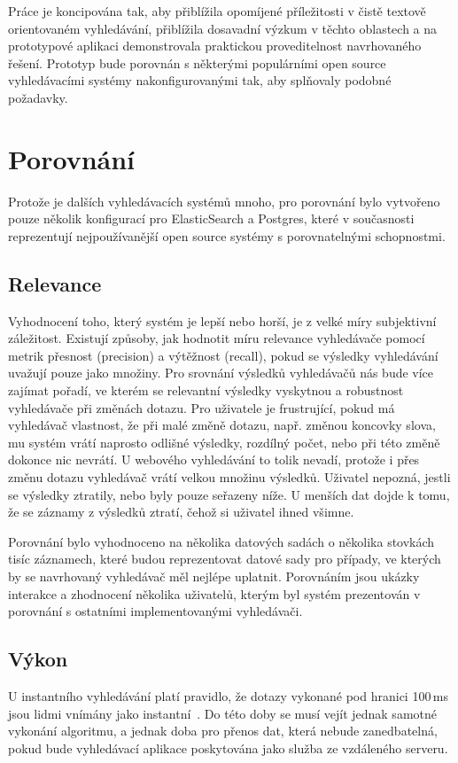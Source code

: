 \documentclass[11pt,letterpaper,oneside,openright]{book}
\begin{document}
Práce je koncipována tak, aby přiblížila opomíjené příležitosti v čistě textově
orientovaném vyhledávání, přiblížila dosavadní výzkum v těchto oblastech a na
prototypové aplikaci demonstrovala praktickou proveditelnost navrhovaného
řešení. Prototyp bude porovnán s některými populárními open source
vyhledávacími systémy nakonfigurovanými tak, aby splňovaly podobné požadavky.

\section{Porovnání}
Protože je dalších vyhledávacích systémů mnoho, pro porovnání bylo vytvořeno
pouze několik konfigurací pro ElasticSearch a Postgres, které v současnosti
reprezentují nejpoužívanější open source systémy s porovnatelnými schopnostmi.

\subsection{Relevance}
Vyhodnocení toho, který systém je lepší nebo horší, je z velké míry subjektivní
záležitost. Existují způsoby, jak hodnotit míru relevance vyhledávače pomocí
metrik přesnost (precision) a výtěžnost (recall), pokud se výsledky vyhledávání
uvažují pouze jako množiny. Pro srovnání výsledků vyhledávačů nás bude více
zajímat pořadí, ve kterém se relevantní výsledky vyskytnou a robustnost
vyhledávače při změnách dotazu. Pro uživatele je frustrující, pokud má
vyhledávač vlastnost, že při malé změně dotazu, např. změnou koncovky slova, mu
systém vrátí naprosto odlišné výsledky, rozdílný počet, nebo při této změně
dokonce nic nevrátí. U webového vyhledávání to tolik nevadí, protože i přes
změnu dotazu vyhledávač vrátí velkou množinu výsledků. Uživatel nepozná, jestli
se výsledky ztratily, nebo byly pouze seřazeny níže. U menších dat dojde k
tomu, že se záznamy z výsledků ztratí, čehož si uživatel ihned všimne.

Porovnání bylo vyhodnoceno na několika datových sadách o několika stovkách
tisíc záznamech, které budou reprezentovat datové sady pro případy, ve kterých
by se navrhovaný vyhledávač měl nejlépe uplatnit. Porovnáním jsou ukázky
interakce a zhodnocení několika uživatelů, kterým byl systém prezentován v
porovnání s ostatními implementovanými vyhledávači.

\subsection{Výkon}
U instantního vyhledávání platí pravidlo, že dotazy vykonané pod hranici
100\,ms jsou lidmi vnímány jako instantní~\cite{sto_ms}. Do této doby se musí
vejít jednak samotné vykonání algoritmu, a jednak doba pro přenos dat, která
nebude zanedbatelná, pokud bude vyhledávací aplikace poskytována jako služba ze
vzdáleného serveru.
\end{document}
